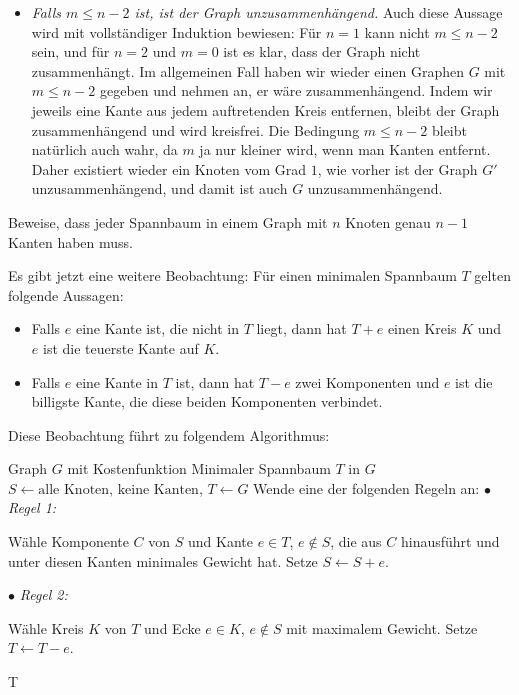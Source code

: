 \documentclass{zusammenfassung}
\begin{document}
\begin{itemize}
	\item \emph{Falls $m\leq n-2$ ist, ist der Graph unzusammenhängend.} Auch diese Aussage wird mit vollständiger Induktion
		bewiesen: Für $n=1$ kann nicht $m\leq n-2$ sein, und für $n=2$ und $m=0$ ist es klar, dass der Graph nicht zusammenhängt. Im
		allgemeinen Fall haben wir wieder einen Graphen $G$ mit $m\leq n-2$ gegeben und nehmen an, er wäre zusammenhängend. Indem wir
		jeweils eine Kante aus jedem auftretenden Kreis entfernen, bleibt der Graph zusammenhängend und wird kreisfrei. Die Bedingung
		$m\leq n-2$ bleibt natürlich auch wahr, da $m$ ja nur kleiner wird, wenn man Kanten entfernt. Daher existiert wieder ein
		Knoten vom Grad $1$, wie vorher ist der Graph $G'$ unzusammenhängend, und damit ist auch $G$ unzusammenhängend.
\end{itemize}

\begin{aufgabe}
	Beweise, dass jeder Spannbaum in einem Graph mit $n$ Knoten genau $n-1$ Kanten haben muss.
\end{aufgabe}

Es gibt jetzt eine weitere Beobachtung: Für einen minimalen Spannbaum $T$ gelten folgende Aussagen:
\begin{itemize}
	\item Falls $e$ eine Kante ist, die nicht in $T$ liegt, dann hat $T+e$ einen Kreis $K$ und $e$ ist die teuerste Kante auf $K$.
	\item Falls $e$ eine Kante in $T$ ist, dann hat $T-e$ zwei Komponenten und $e$ ist die billigste Kante, die diese beiden
		Komponenten verbindet.
\end{itemize}

\pagebreak

Diese Beobachtung führt zu folgendem Algorithmus:

\renewcommand{\algorithmicrequire}{\textbf{Eingabe:}}
\renewcommand{\algorithmicensure}{\textbf{Ausgabe:}}
\begin{algorithmic}
	\Require Graph $G$ mit Kostenfunktion
	\Ensure Minimaler Spannbaum $T$ in $G$
	\State $S\gets\text{alle Knoten, keine Kanten}$, $T\gets G$
		\State Wende eine der folgenden Regeln an:
		\State $\bullet$ \emph{Regel 1:}\enskip\begin{minipage}[t]{0.7\textwidth}Wähle Komponente $C$ von $S$ und Kante $e\in T$, 
		  $e\notin S$, die aus $C$ hinausführt und unter diesen Kanten minimales Gewicht hat. Setze $S\gets S+e$.\\[-1ex]\end{minipage}
		\State $\bullet$ \emph{Regel 2:}\enskip\begin{minipage}[t]{0.7\textwidth}Wähle Kreis $K$ von $T$ und Ecke $e\in K$, $e\notin
			S$ mit maximalem Gewicht. Setze $T\gets T-e$.\end{minipage}
	\EndWhile
	\State \Return T
\end{algorithmic}
\end{document}

